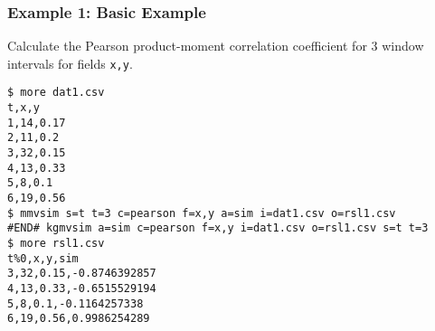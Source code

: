 \subsubsection*{Example 1: Basic Example}

Calculate the Pearson product-moment correlation coefficient for 3 window intervals for fields \verb|x,y|.


\begin{Verbatim}[baselinestretch=0.7,frame=single]
$ more dat1.csv
t,x,y
1,14,0.17
2,11,0.2
3,32,0.15
4,13,0.33
5,8,0.1
6,19,0.56
$ mmvsim s=t t=3 c=pearson f=x,y a=sim i=dat1.csv o=rsl1.csv
#END# kgmvsim a=sim c=pearson f=x,y i=dat1.csv o=rsl1.csv s=t t=3
$ more rsl1.csv
t%0,x,y,sim
3,32,0.15,-0.8746392857
4,13,0.33,-0.6515529194
5,8,0.1,-0.1164257338
6,19,0.56,0.9986254289
\end{Verbatim}
